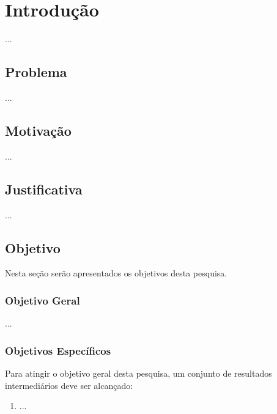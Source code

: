 %
%
\chapter{Introdução}\label{sec:introducao}

...

\section{Problema}\label{sec:problem}

...

\section{Motivação}\label{sec:motivacao}

...

\section{Justificativa}\label{sec:justificativa}

...


\section{Objetivo}\label{sec:objetivo}
Nesta seção serão apresentados os objetivos desta pesquisa.
\subsection{Objetivo Geral}

...

\begin{comment}
O objetivo dessa dissertação é desenvolver uma abordagem capaz de traduzir frases de LIBRAS para Português com resultados comparáveis ao estado da arte atual, através de técnicas de aprendizagem profunda.
\end{comment}

\subsection{Objetivos Específicos}
Para atingir o objetivo geral desta pesquisa, um conjunto de resultados intermediários deve ser alcançado:
\begin{enumerate}
\item ...
\begin{comment}
\item Gerar e disponibilizar uma base de vídeos de sinais de LIBRAS utilizados na alfabetização de surdos, devidamente rotulada em glosa e Português.
\item Adequar e combinar métodos de reconhecimento de sinal, a fim de alcançar um melhor desempenho do reconhecimento dos sinais.
\item Adequar e combinar métodos de tradução de codificação e decodificação, a fim de alcançar uma melhorar a semântica das frases geradas.

\end{comment}
\end{enumerate}


